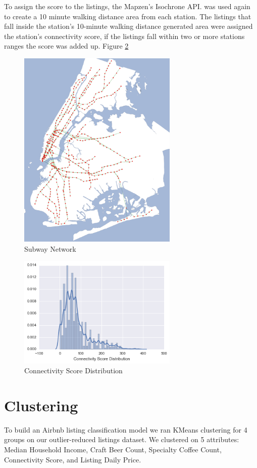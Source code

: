 \documentclass[conference]{IEEEtran}
\begin{document}
To assign the score to the listings, the Mapzen's Isochrone API.\cite{mapzen_isochrone} was used again to create a 10 minute walking distance area from each station. The listings that fall inside the station's 10-minute walking distance generated area were assigned the station's connectivity score, if the listings fall within two or more stations ranges the score was added up.  Figure \ref{connect_score}

\begin{figure}[H]
\centering
\includegraphics[width=3in]{Subway_Network}
\caption{Subway Network}
\label{Subway_Network}
\end{figure}


\begin{figure}[H]
\centering
\includegraphics[width=3in]{connect_score}
\caption{Connectivity Score Distribution}
\label{connect_score}
\end{figure}

\section{Clustering}
To build an Airbnb listing classification model we ran KMeans clustering for 4 groups on our outlier-reduced listings
dataset. We clustered on 5 attributes:  Median Household Income, Craft Beer Count, Specialty Coffee Count, Connectivity Score,
and Listing Daily Price.
\end{document}
